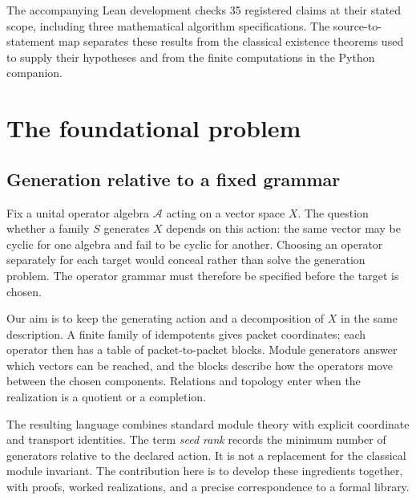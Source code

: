 \documentclass[11pt]{article}
\theoremstyle{definition}
\theoremstyle{remark}
\newcommand{\cA}{\mathcal A}
\begin{document}
The accompanying Lean development checks 35 registered claims at their
stated scope, including three mathematical algorithm specifications.
The source-to-statement map separates these results from the classical
existence theorems used to supply their hypotheses and from the finite
computations in the Python companion.

\smallskip
{}\par
\vspace{0.6em}
\noindent{\color{rulegray}\rule{\textwidth}{0.5pt}}\par

\clearpage
\section{The foundational problem}

\subsection{Generation relative to a fixed grammar}

Fix a unital operator algebra $\cA$ acting on a vector space $X$.
The question whether a family $S$ generates $X$ depends on this action:
the same vector may be cyclic for one algebra and fail to be cyclic for
another. Choosing an operator separately for each target would conceal
rather than solve the generation problem. The operator grammar must
therefore be specified before the target is chosen.

Our aim is to keep the generating action and a decomposition of $X$ in the
same description. A finite family of idempotents gives packet coordinates;
each operator then has a table of packet-to-packet blocks. Module generators
answer which vectors can be reached, and the blocks describe how the
operators move between the chosen components. Relations and topology enter
when the realization is a quotient or a completion.

The resulting language combines standard module theory with explicit
coordinate and transport identities. The term \emph{seed rank} records the
minimum number of generators relative to the declared action. It is not a
replacement for the classical module invariant. The contribution here is
to develop these ingredients together, with proofs, worked realizations,
and a precise correspondence to a formal library.
\end{document}
